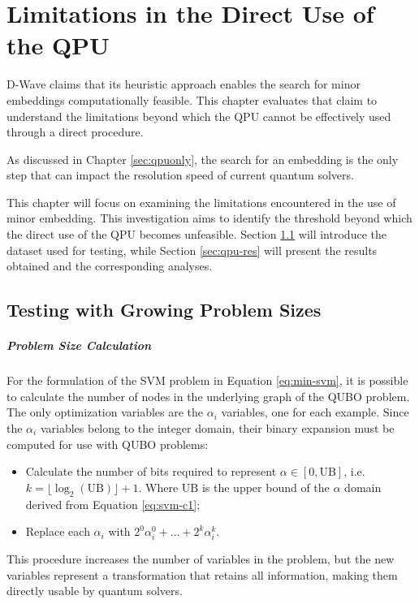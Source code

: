 \chapter{Limitations in the Direct Use of the QPU}

D-Wave claims that its heuristic approach enables the search for minor embeddings computationally feasible. 
This chapter evaluates that claim to understand the limitations beyond which the QPU cannot be effectively used through a direct procedure.

As discussed in Chapter \ref{sec:qpuonly}, the search for an embedding is the only step that can impact the resolution speed of current quantum solvers. 

This chapter will focus on examining the limitations encountered in the use of minor embedding. 
This investigation aims to identify the threshold beyond which the direct use of the QPU becomes unfeasible.
Section \ref{sec:qpu-dataset} will introduce the dataset used for testing, while Section \ref{sec:qpu-res} will present the results obtained and the corresponding analyses.

\section{Testing with Growing Problem Sizes}\label{sec:qpu-dataset}

\paragraph{Problem Size Calculation} For the formulation of the SVM problem in Equation \ref{eq:min-svm}, it is possible to calculate the number of nodes in the underlying graph of the QUBO problem. 
The only optimization variables are the $\alpha_i$ variables, one for each example. 
Since the $\alpha_i$ variables belong to the integer domain, their binary expansion must be computed for use with QUBO problems:

\begin{itemize} 
	\item Calculate the number of bits required to represent $\alpha \in [0, \text{UB}]$, i.e. $k = \lfloor\log_2(\text{UB})\rfloor + 1$. Where $\text{UB}$ is the upper bound of the $\alpha$ domain derived from Equation \ref{eq:svm-c1}; 
	\item Replace each $\alpha_i$ with $2^0\alpha_i^0 + \dots + 2^k\alpha_i^k$. 
\end{itemize}

This procedure increases the number of variables in the problem, but the new variables represent a transformation that retains all information, making them directly usable by quantum solvers.

